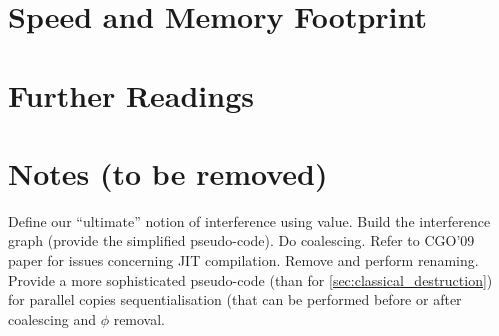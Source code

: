 \section{Speed and Memory Footprint}
 \section{Further Readings}

\section{Notes (to be removed)}

Define our ``ultimate'' notion of interference using value. Build the interference graph (provide the simplified pseudo-code). Do coalescing. Refer to CGO'09 paper for issues concerning JIT compilation. Remove \phifuns and perform renaming. Provide a more sophisticated pseudo-code (than for \ref{sec:classical_destruction}) for parallel copies sequentialisation (that can be performed before or after coalescing and $\phi$ removal.




